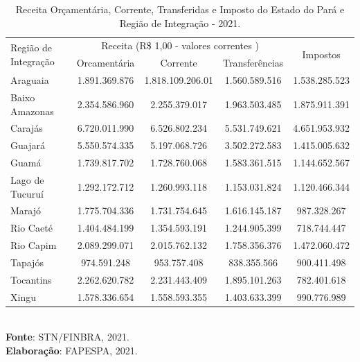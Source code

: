 \begin{table}[!htb]
\centering
    {
    \caption{Receita Orçamentária, Corrente, Transferidas e Imposto do Estado do Pará e Região de Integração - 2021.}
    \label{obitos2}
    \vspace{0.1cm}
\begin{tabular}{l|c|c|c|c}
\hline\hline 
\multirow{2}{*}{Região de Integração} & \multicolumn{3}{c|}{Receita (R\$ 1,00 - valores correntes )}                                                     & \multirow{2}{*}{Impostos} \\ \cline{2-4}
                           & \multicolumn{1}{c|}{Orcamentária} & \multicolumn{1}{c|}{Corrente} & Transferências &  \\ 
\hline\hline                           
Araguaia           &  1.891.369.876 & 1.818.109.206.01 & 1.560.589.516 & 1.538.285.523 \\
Baixo Amazonas     &  2.354.586.960 & 2.255.379.017    & 1.963.503.485 & 1.875.911.391 \\
Carajás            &  6.720.011.990 & 6.526.802.234    & 5.531.749.621 & 4.651.953.932 \\
Guajará            &  5.550.574.335 & 5.197.068.726    & 3.502.272.583 & 1.415.005.632 \\
Guamá              &  1.739.817.702 & 1.728.760.068    & 1.583.361.515 & 1.144.652.567 \\
Lago de Tucuruí    &  1.292.172.712 & 1.260.993.118    & 1.153.031.824 & 1.120.466.344 \\
Marajó             &  1.775.704.336 & 1.731.754.645    & 1.616.145.187 & 987.328.267   \\
Rio Caeté          &  1.404.484.199 & 1.354.593.191    & 1.244.905.399 &  718.744.447  \\
Rio Capim          &  2.089.299.071 & 2.015.762.132    & 1.758.356.376 &  1.472.060.472 \\
Tapajós            &  974.591.248   & 953.757.408      & 838.355.566   &  900.411.498  \\
Tocantins          &  2.262.620.782 & 2.231.443.409    & 1.895.101.263 &  782.401.618 \\
Xingu              &  1.578.336.654 & 1.558.593.355    & 1.403.633.399 &  990.776.989 \\                   
\hline\hline
\end{tabular}}
\\ 
\hspace{-8.4cm}
\textbf{Fonte}: STN/FINBRA, 2021. \\
\hspace{-8.2cm}
\textbf{Elaboração}: FAPESPA, 2021.
\end{table}


